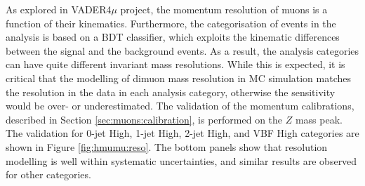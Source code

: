 As explored in VADER4$\mu$ project, the momentum resolution of muons
is a function of their kinematics. Furthermore, the categorisation of
events in the analysis is based on a BDT classifier, which exploits
the kinematic differences between the signal and the background events.
As a result, the analysis categories can have quite different
invariant mass resolutions. While this is expected, it is critical
that the modelling of dimuon mass resolution in MC simulation matches
the resolution in the data in each analysis category, otherwise the
sensitivity would be over- or underestimated. The validation of
the momentum calibrations, described in Section \ref{sec:muons:calibration},
is performed on the $Z$ mass peak. The validation for 0-jet High,
1-jet High, 2-jet High, and VBF High categories are shown in
Figure \ref{fig:hmumu:reso}. The bottom panels show that resolution
modelling is well within systematic uncertainties, and similar results are
observed for other categories.
